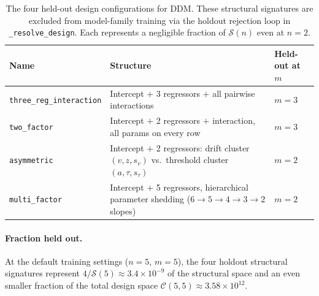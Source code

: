\documentclass[11pt]{article}
\begin{document}
\begin{table}[h]
\centering
\caption{The four held-out design configurations for DDM.  These structural
  signatures are excluded from model-family training via the holdout rejection
  loop in \texttt{\_resolve\_design}.  Each represents a negligible fraction
  of $\mathcal{S}(n)$ even at $n = 2$.}
\label{tab:holdout}
\begin{tabular}{lll}
\toprule
Name & Structure & Held-out at $m$ \\
\midrule
\texttt{three\_reg\_interaction}
  & Intercept $+$ 3 regressors $+$ all pairwise interactions
  & $m = 3$ \\
\texttt{two\_factor}
  & Intercept $+$ 2 regressors $+$ interaction, all params on every row
  & $m = 3$ \\
\texttt{asymmetric}
  & Intercept $+$ 2 regressors: drift cluster $(v, z, s_v)$ vs.\ threshold cluster $(a, \tau, s_\tau)$
  & $m = 2$ \\
\texttt{multi\_factor}
  & Intercept $+$ 5 regressors, hierarchical parameter shedding ($6 \to 5 \to 4 \to 3 \to 2$ slopes)
  & $m = 2$ \\
\bottomrule
\end{tabular}
\end{table}

\paragraph{Fraction held out.}
At the default training settings ($n = 5$, $m = 5$), the four holdout
structural signatures represent
$4 / \mathcal{S}(5) \approx 3.4 \times 10^{-9}$
of the structural space and an even smaller fraction of the total design
space $\mathcal{C}(5, 5) \approx 3.58 \times 10^{12}$.
\end{document}
